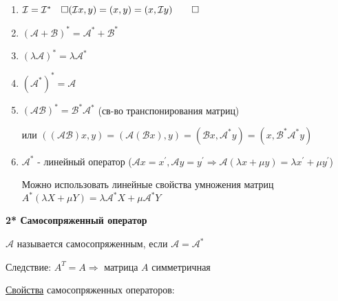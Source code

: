 \documentclass[12pt]{article}
\begin{document}
    \begin{enumerate}

        \item $\mathcal{I} = \mathcal{I}^* \quad \Box (\mathcal{I}x, y) = (x, y) = (x, \mathcal{I}y) \qed$

        \item $(\mathcal{A} + \mathcal{B})^* = \mathcal{A}^* + \mathcal{B}^*$

        \item $(\lambda \mathcal{A})^* = \lambda \mathcal{A}^*$

        \item $(\mathcal{A}^*)^* = \mathcal{A}$

        \item $(\mathcal{A}\mathcal{B})^* = \mathcal{B}^* \mathcal{A}^*$ (св-во транспонирования матриц)

        или $((\mathcal{AB})x, y) = (\mathcal{A}(\mathcal{B}x), y) = (\mathcal{B}x, \mathcal{A}^* y) = (x, \mathcal{B}^* \mathcal{A}^* y)$

        \item $\mathcal{A}^*$ - линейный оператор ($\mathcal{A}x = x^\prime, \mathcal{A}y = y^\prime \Longrightarrow \mathcal{A}(\lambda x + \mu y) = \lambda x^\prime + \mu y^\prime$)

        Можно использовать линейные свойства умножения матриц $A^* (\lambda X + \mu Y) = \lambda \mathcal{A}^* X + \mu \mathcal{A}^* Y$
    \end{enumerate}

    \hypertarget{selfconjugateoperator}{}

    \textbf{2* Самосопряженный оператор}

    \Def $\mathcal{A}$ называется самосопряженным, если $\mathcal{A} = \mathcal{A}^*$

    Следствие: $A^T = A \Longrightarrow$ матрица $A$ симметричная

    \hypertarget{selfconjugateoperatorproperties}{}

    \underline{Свойства} самосопряженных операторов:
\end{document}
